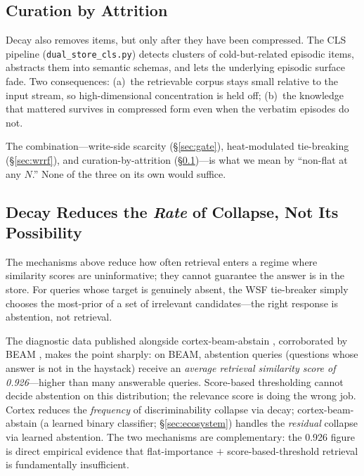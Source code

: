 \documentclass[11pt]{article}
\begin{document}
\subsection{Curation by Attrition}
\label{sec:curation}

Decay also removes items, but only after they have been compressed.
The CLS pipeline (\texttt{dual\_store\_cls.py}) detects clusters of
cold-but-related episodic items, abstracts them into semantic
schemas, and lets the underlying episodic surface fade.  Two
consequences: (a)~the retrievable corpus stays small relative to
the input stream, so high-dimensional concentration is held off;
(b)~the knowledge that mattered survives in compressed form even
when the verbatim episodes do not.

The combination---write-side scarcity (\S\ref{sec:gate}),
heat-modulated tie-breaking (\S\ref{sec:wrrf}), and
curation-by-attrition (\S\ref{sec:curation})---is what we mean by
``non-flat at any $N$.''  None of the three on its own would
suffice.

\subsection{Decay Reduces the \emph{Rate} of Collapse, Not Its Possibility}
\label{sec:rate-not-possibility}

The mechanisms above reduce how often retrieval enters a regime
where similarity scores are uninformative; they cannot guarantee the
answer is in the store.  For queries whose target is genuinely
absent, the WSF tie-breaker simply chooses the most-prior of a set
of irrelevant candidates---the right response is abstention, not
retrieval.

The diagnostic data published alongside cortex-beam-abstain
\citep{Deust2026a}, corroborated by BEAM \citep{Tavakoli2026},
makes the point sharply: on BEAM, abstention queries (questions
whose answer is not in the haystack) receive an \emph{average
retrieval similarity score of 0.926}---higher than many answerable
queries.  Score-based thresholding cannot decide abstention on this
distribution; the relevance score is doing the wrong job.  Cortex
reduces the \emph{frequency} of discriminability collapse via decay;
cortex-beam-abstain (a learned binary classifier;
\S\ref{sec:ecosystem}) handles the \emph{residual} collapse via
learned abstention.  The two mechanisms are complementary: the
0.926 figure is direct empirical evidence that flat-importance
$+$ score-based-threshold retrieval is fundamentally insufficient.
\end{document}
